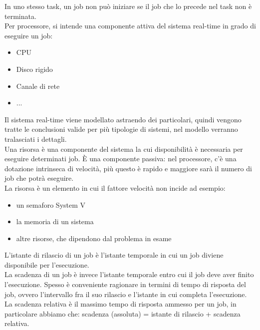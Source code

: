 \documentclass{article}
\begin{document}
In uno stesso task, un job non può iniziare se il job che lo precede nel task non è terminata.\\ Per processore, si intende una componente attiva del sistema real-time in grado di eseguire un job:
\begin{itemize}
\item CPU
\item Disco rigido
\item Canale di rete
\item ...
\end{itemize}
Il sistema real-time viene modellato astraendo dei particolari, quindi vengono tratte le conclusioni valide per più tipologie di sistemi, nel modello verranno tralasciati i dettagli.\\ Una risorsa è una componente del sistema la cui disponibilità è necessaria per eseguire determinati job. È una componente passiva: nel processore, c'è una dotazione intrinseca di velocità, più questo è rapido e maggiore sarà il numero di job che potrà eseguire.\\ La risorsa è un elemento in cui il fattore velocità non incide ad esempio:
\begin{itemize}
\item un semaforo System V
\item la memoria di un sistema
\item altre risorse, che dipendono dal problema in esame
\end{itemize}
L'istante di rilascio di un job è l'istante temporale in cui un job diviene disponibile per l'esecuzione.\\ La scadenza di un job è invece l'istante temporale entro cui il job deve aver finito l'esecuzione. Spesso è conveniente ragionare in termini di tempo di risposta del job, ovvero l'intervallo fra il suo rilascio e l'istante in cui completa l'esecuzione.\\ La scadenza relativa è il massimo tempo di risposta ammesso per un job, in particolare abbiamo che: scadenza (assoluta) = istante di rilascio + scadenza relativa.
\end{document}
